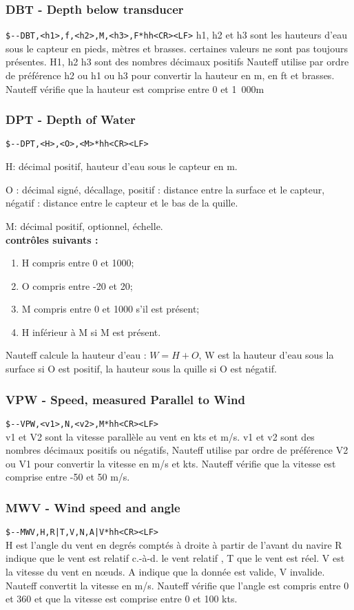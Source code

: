 \documentclass[a4paper,11pt]{report}
\begin{document}
\subsubsection{DBT - Depth below transducer}
\texttt{\${-}{-}DBT,<h1>,f,<h2>,M,<h3>,F*hh<CR><LF>}
h1, h2 et h3 sont les hauteurs d'eau sous le capteur en pieds, mètres et brasses.
certaines valeurs ne sont pas toujours présentes.
H1, h2 h3 sont des nombres décimaux positifs
Nauteff utilise par ordre de préférence h2 ou h1 ou h3
pour convertir la hauteur en m, en ft et brasses.
Nauteff vérifie que la hauteur est comprise entre 0 et 1~000m


\subsubsection{DPT - Depth of Water}
\texttt{\${-}{-}DPT,<H>,<O>,<M>*hh<CR><LF>}

H: décimal positif, hauteur d'eau sous le capteur en m.

O  : décimal signé,  décallage, positif : distance entre la surface et le capteur, négatif : distance entre le capteur et le bas de la quille.

M: décimal positif, optionnel, échelle.
\\
\textbf{ contrôles suivants :}
\begin{enumerate}
	\item H compris entre 0 et 1000;
	\item O compris entre -20 et 20;
	\item M compris entre 0 et 1000 s'il est présent;
	\item H inférieur à M si M est présent.
\end{enumerate}
Nauteff calcule la hauteur d'eau : \(W = H + O\), W est la hauteur d'eau sous la surface si O est positif, la hauteur sous la quille si O est négatif.


\subsubsection{VPW - Speed, measured Parallel to Wind}
\texttt{\${-}{-}VPW,<v1>,N,<v2>,M*hh<CR><LF>}
\\
v1 et V2 sont la vitesse parallèle au vent en kts et m/s.
v1 et v2 sont des nombres décimaux positifs ou négatifs,
Nauteff utilise par ordre de préférence V2 ou V1
pour convertir la vitesse en m/s et kts.
Nauteff vérifie que la vitesse est comprise entre -50 et 50 m/s.

\subsubsection{MWV - Wind speed and angle}
\texttt{\${-}{-}MWV,H,R|T,V,N,A|V*hh<CR><LF>}
\\
H est l'angle du vent en degrés comptés à droite à partir de l'avant du navire
R indique que le vent est relatif c.-à-d. le vent relatif , T que le vent est réel.
V est la vitesse du vent en nœuds.
A indique que la donnée est valide, V invalide.
Nauteff convertit la vitesse en m/s.
Nauteff vérifie que l'angle est compris entre 0 et 360 et que la vitesse est comprise entre 0 et 100 kts.
\end{document}
